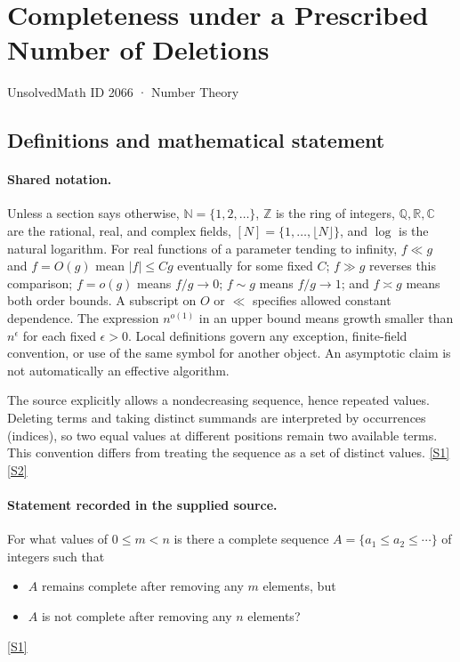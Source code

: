 \documentclass[11pt,a4paper]{article}
\newcommand{\N}{\mathbb{N}}
\newcommand{\Z}{\mathbb{Z}}
\newcommand{\Q}{\mathbb{Q}}
\newcommand{\R}{\mathbb{R}}
\newcommand{\C}{\mathbb{C}}
\newcommand{\sref}[2]{\hyperlink{source:#1:#2}{[S#2]}}
\begin{document}

\setcounter{section}{2065}

\section{Completeness under a Prescribed Number of Deletions}\label{2066}

{\small\sffamily UnsolvedMath ID 2066 · Number Theory}

\subsection{Definitions and mathematical statement}

\paragraph{Shared notation.}Unless a section says otherwise, $\N=\{1,2,\ldots\}$,
$\Z$ is the ring of integers, $\Q,\R,\C$ are the rational, real, and complex
fields, $[N]=\{1,\ldots,\lfloor N\rfloor\}$, and $\log$ is the natural
logarithm. For real functions of a parameter tending to infinity,
$f\ll g$ and $f=O(g)$ mean $|f|\leq Cg$ eventually for some fixed $C$;
$f\gg g$ reverses this comparison; $f=o(g)$ means $f/g\to0$;
$f\sim g$ means $f/g\to1$; and $f\asymp g$ means both order bounds.
A subscript on $O$ or $\ll$ specifies allowed constant dependence.
The expression $n^{o(1)}$ in an upper bound means growth smaller than
$n^\epsilon$ for each fixed $\epsilon>0$. Local definitions govern any
exception, finite-field convention, or use of the same symbol for another
object. An asymptotic claim is not automatically an effective algorithm.



The source explicitly allows a nondecreasing sequence, hence repeated values. Deleting terms and taking distinct summands are interpreted by occurrences (indices), so two equal values at different positions remain two available terms. This convention differs from treating the sequence as a set of distinct values. \sref{2066}{1} \sref{2066}{2}

\paragraph{Statement recorded in the supplied source.}
For what values of $0\leq m<n$ is there a complete sequence $A=\{a_1\leq a_2\leq \cdots\}$ of integers such that
\begin{itemize}
\item  $A$ remains complete after removing any $m$ elements, but 
\item  $A$ is not complete after removing any $n$ elements? 
\end{itemize} \sref{2066}{1}
\end{document}
